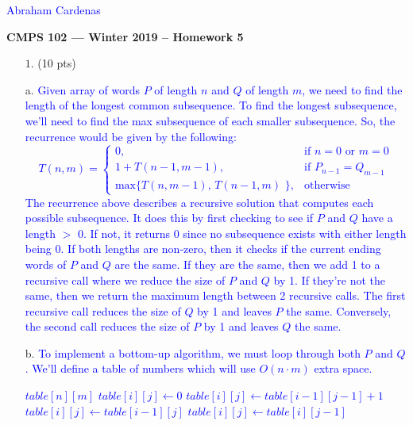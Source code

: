 \documentclass[11pt]{article}
\begin{document}
\textcolor{blue}{\hfill Abraham Cardenas} 


\begin{center}
{\bf\Large CMPS 102 --- Winter 2019 --  Homework 5}
\end{center}

\begin{itemize}

\item[$1.$] (10 pts)
\item[a.] 
\textcolor{blue}{
Given array of words $P$ of length $n$ and $Q$ of length $m$, we need to find the length of the longest common subsequence. To find the longest subsequence, we'll need to find the max subsequence of each smaller subsequence. So, the recurrence would be given by the following:  $$\boxed{{\displaystyle T(n,m)={
\begin{cases}{0},&{\text{if }} n = 0 \text{ or } m = 0\\ 1 + T(n-1,m-1),&{\text{if }} P_{n-1} = Q_{m-1}\\ \text{max\{ } T(n, m-1) \text{, } T(n-1, m)\text{ \}},&{\text{otherwise}} 
\end{cases}}}}$$
The recurrence above describes a recursive solution that computes each possible subsequence. It does this by first checking to see if $P$ and $Q$ have a length $>$ 0. If not, it returns 0 since no subsequence exists with either length being 0. If both lengths are non-zero, then it checks if the current ending words of $P$ and $Q$ are the same. If they are the same, then we add 1 to a recursive call where we reduce the size of $P$ and $Q$ by 1. If they're not the same, then we return the maximum length between 2 recursive calls. The first recursive call reduces the size of $Q$ by 1 and leaves $P$ the same. Conversely, the second call reduces the size of $P$ by 1 and leaves $Q$ the same.
}
\item[b.]
\textcolor{blue}{
To implement a bottom-up algorithm, we must loop through both $P$ and $Q$. We'll define a table of numbers which will use $O(n \cdot m)$ extra space.
}
\textcolor{blue}{
\begin{algorithmic}[1]
	\State $table[n][m]$	
				\State $table[i][j] \gets 0$ 
				\State $table[i][j] \gets table[i-1][j-1] + 1$
			\Else
					\State $table[i][j] \gets table[i-1][j]$
				\Else 
					\State $table[i][j] \gets table[i][j-1]$

\end{algorithmic}}
\end{itemize}
\end{document}
